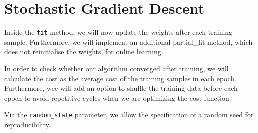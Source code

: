 \documentclass[11pt]{article}
\begin{document}
    \section{Stochastic Gradient Descent}\label{stochastic-gradient-descent}

Inside the \texttt{fit} method, we will now update the weights after
each training sample. Furthermore, we will implement an additional
partial\_fit method, which does not reinitialise the weights, for online
learning.

In order to check whether our algorithm converged after training, we
will calculate the cost as the average cost of the training samples in
each epoch. Furthermore, wee will add an option to shuffle the training
data before each epoch to avoid repetitive cycles when we are optimizing
the cost function.

Via the \texttt{random\_state} parameter, we allow the specification of
a random seed for reproducibility.
\end{document}
